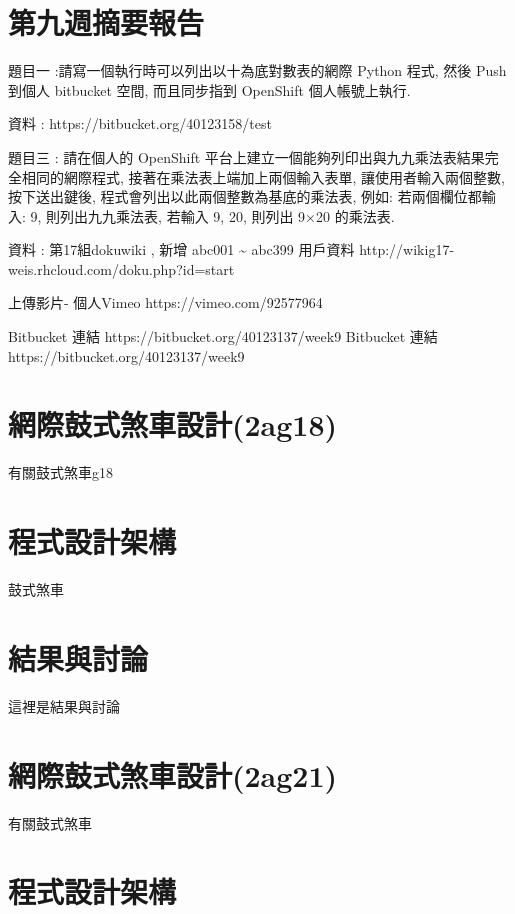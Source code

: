 \documentclass[]{article}
\begin{document}
\section{第九週摘要報告}\label{ux7b2cux4e5dux9031ux6458ux8981ux5831ux544a}

題目一 :請寫一個執行時可以列出以十為底對數表的網際 Python 程式, 然後
Push 到個人 bitbucket 空間, 而且同步指到 OpenShift 個人帳號上執行.

資料 : https://bitbucket.org/40123158/test

題目三 : 請在個人的 OpenShift
平台上建立一個能夠列印出與九九乘法表結果完全相同的網際程式,
接著在乘法表上端加上兩個輸入表單, 讓使用者輸入兩個整數, 按下送出鍵後,
程式會列出以此兩個整數為基底的乘法表, 例如: 若兩個欄位都輸入: 9,
則列出九九乘法表, 若輸入 9, 20, 則列出 9×20 的乘法表.

資料 : 第17組dokuwiki , 新增 abc001 \textasciitilde{} abc399 用戶資料
http://wikig17-weis.rhcloud.com/doku.php?id=start

上傳影片- 個人Vimeo https://vimeo.com/92577964

Bitbucket 連結 https://bitbucket.org/40123137/week9 Bitbucket 連結
https://bitbucket.org/40123137/week9

\section{網際鼓式煞車設計(2ag18)}\label{ux7db2ux969bux9f13ux5f0fux715eux8ecaux8a2dux8a082ag18}

有關鼓式煞車g18

\section{程式設計架構}\label{ux7a0bux5f0fux8a2dux8a08ux67b6ux69cb-11}

鼓式煞車

\section{結果與討論}\label{ux7d50ux679cux8207ux8a0eux8ad6-11}

這裡是結果與討論

\section{網際鼓式煞車設計(2ag21)}\label{ux7db2ux969bux9f13ux5f0fux715eux8ecaux8a2dux8a082ag21}

有關鼓式煞車

\section{程式設計架構}\label{ux7a0bux5f0fux8a2dux8a08ux67b6ux69cb-12}
\end{document}
